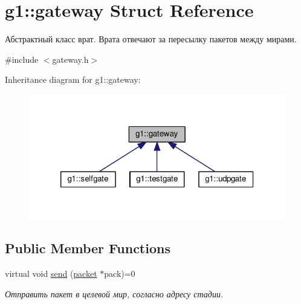 \hypertarget{structg1_1_1gateway}{}\section{g1\+:\+:gateway Struct Reference}
\label{structg1_1_1gateway}


Абстрактный класс врат. Врата отвечают за пересылку пакетов между мирами.  




{\ttfamily \#include $<$gateway.\+h$>$}



Inheritance diagram for g1\+:\+:gateway\+:\nopagebreak
\begin{figure}[H]
\begin{center}
\leavevmode
\includegraphics[width=320pt]{structg1_1_1gateway__inherit__graph}
\end{center}
\end{figure}
\subsection*{Public Member Functions}
\begin{DoxyCompactItemize}
\item 
virtual void \hyperlink{structg1_1_1gateway_a5748219660a573356ab0e52f715eebbf}{send} (\hyperlink{structg1_1_1packet}{packet} $\ast$pack)=0
\begin{DoxyCompactList}\small\item\em Отправить пакет в целевой мир, согласно адресу стадии. \end{DoxyCompactList}\end{DoxyCompactItemize}
